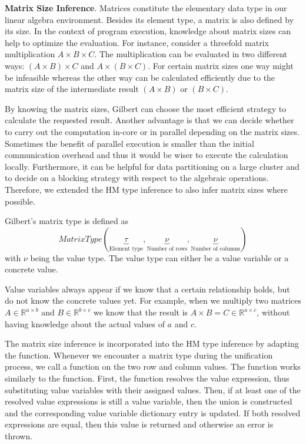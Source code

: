 
\textbf{Matrix Size Inference}. Matrices constitute the elementary data type in our linear algebra environment.
Besides its element type, a matrix is also defined by its size.
In the context of program execution, knowledge about matrix sizes can help to optimize the evaluation.
For instance, consider a threefold matrix multiplication $A\times B\times C$.
The multiplication can be evaluated in two different ways: $(A\times B)\times C$ and $A\times(B\times C)$.
For certain matrix sizes one way might be infeasible whereas the other way can be calculated efficiently due to the matrix size of the intermediate result $(A\times B)$ or $(B\times C)$.

By knowing the matrix sizes, Gilbert can choose the most efficient strategy to calculate the requested result.
Another advantage is that we can decide whether to carry out the computation in-core or in parallel depending on the matrix sizes.
Sometimes the benefit of parallel execution is smaller than the initial communication overhead and thus it would be wiser to execute the calculation locally.
Furthermore, it can be helpful for data partitioning on a large cluster and to decide on a blocking strategy with respect to the algebraic operations.
Therefore, we extended the HM type inference to also infer matrix sizes where possible.

Gilbert's matrix type is defined as 
\begin{displaymath}
MatrixType(\underbrace{\tau}_{\text{Element type}},\underbrace{\nu}_{\text{Number of rows}},\underbrace{\nu}_{\text{Number of columns}})
\end{displaymath}
with $\nu$ being the value type. The value type can either be a value variable or a concrete value.

Value variables always appear if we know that a certain relationship holds, but do not know the concrete values yet.
For example, when we multiply two matrices $A\in\mathbb{R}^{a\times b}$ and $B\in\mathbb{R}^{b\times c}$ we know that the result is $A\times B = C \in \mathbb{R}^{a\times c}$, without having knowledge about the actual values of $a$ and $c$.

The matrix size inference is incorporated into the HM type inference by adapting the  function.
Whenever we encounter a matrix type during the unification process, we call a  function on the two row and column values.
The  function works similarly to the  function.
First, the function resolves the value expression, thus substituting value variables with their assigned values.
Then, if at least one of the resolved value expressions is still a value variable, then the union is constructed and the corresponding value variable dictionary entry is updated.
If both resolved expressions are equal, then this value is returned and otherwise an error is thrown.

